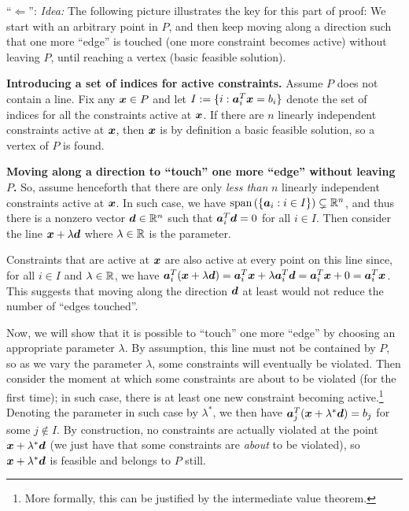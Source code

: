 \begin{enumerate}
\begin{pf}
``\(\Leftarrow\)'': \emph{Idea:} The following picture illustrates the key
 for this part of proof: We start with an arbitrary point in
\(P\), and then keep moving along a direction such that one more ``edge'' is
touched (one more constraint becomes active) without leaving \(P\), until
reaching a vertex (basic feasible solution).
\begin{center}
\end{center}
\textbf{Introducing a set of indices for active constraints.}
Assume \(P\) does not contain a line. Fix any \(\bm{x}\in P\) and let
\(I:=\{i:\bm{a}_{i}^{T}\bm{x}=b_i\}\) denote the set of indices for all the
constraints active at \(\bm{x}\). If there are \(n\) linearly independent
constraints active at \(\bm{x}\), then \(\bm{x}\) is by definition a basic
feasible solution, so a vertex of \(P\) is found.

\textbf{Moving along a direction to ``touch'' one more ``edge'' without leaving \(P\).}
So, assume henceforth that there are only \emph{less than} \(n\) linearly
independent constraints active at \(\bm{x}\). In such case, we have
\(\operatorname{span}\left(\{\bm{a}_i:i\in I\}\right)\subsetneq \mathbb{R}^n\), and thus there is a nonzero
vector \(\bm{d}\in \mathbb{R}^n\) such that \(\bm{a}_i^{T}\bm{d}=0\) for all
\(i\in I\). Then consider the line \(\bm{x}+\lambda\bm{d}\) where
\(\lambda\in\mathbb{R}\) is the parameter.

Constraints that are active at \(\bm{x}\) are also active at every point on
this line since, for all \(i\in I\) and \(\lambda\in\mathbb{R}\), we have
\(\bm{a}_i^{T}(\bm{x}+\lambda\bm{d})
=\bm{a}_i^{T}\bm{x}+\lambda\bm{a}_i^{T}\bm{d}=\bm{a}_i^{T}\bm{x}+0=\bm{a}_i^{T}\bm{x}\).
This suggests that moving along the direction \(\bm{d}\) at least would not
reduce the number of ``edges touched''.

Now, we will show that it is possible to ``touch'' one more ``edge'' by
choosing an appropriate parameter \(\lambda\). By assumption, this line must
not be contained by \(P\), so as we vary the parameter \(\lambda\), some
constraints will eventually be violated. Then consider the moment at which some
constraints are about to be violated (for the first time); in such case, there is
at least one new constraint becoming active.\footnote{More formally, this can
be justified by the intermediate value theorem.} Denoting the parameter in such
case by \(\lambda^*\), we then have
\(\bm{a}_j^{T}(\bm{x}+\lambda^{*}\bm{d})=b_j\) for some \(j\notin I\). By
construction, no constraints are actually violated at the point
\(\bm{x}+\lambda^{*}\bm{d}\) (we just have that some constraints are
\emph{about} to be violated), so \(\bm{x}+\lambda^{*}\bm{d}\) is feasible
and belongs to \(P\) still.


\end{pf}
\end{enumerate}
